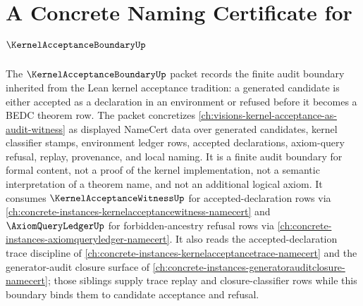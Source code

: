 \chapter{A Concrete Naming Certificate for $\KernelAcceptanceBoundaryUp$}
\label{ch:concrete-instances-kernel-acceptance-boundary-namecert}

The $\KernelAcceptanceBoundaryUp$ packet records the finite audit boundary inherited from the Lean kernel acceptance tradition: a generated candidate is either accepted as a declaration in an environment or refused before it becomes a BEDC theorem row. The packet concretizes \autoref{ch:visions-kernel-acceptance-as-audit-witness} as displayed NameCert data over generated candidates, kernel classifier stamps, environment ledger rows, accepted declarations, axiom-query refusal, replay, provenance, and local naming. It is a finite audit boundary for formal content, not a proof of the kernel implementation, not a semantic interpretation of a theorem name, and not an additional logical axiom.
It consumes $\KernelAcceptanceWitnessUp$ for accepted-declaration rows via \autoref{ch:concrete-instances-kernelacceptancewitness-namecert} and $\AxiomQueryLedgerUp$ for forbidden-ancestry refusal rows via \autoref{ch:concrete-instances-axiomqueryledger-namecert}. It also reads the accepted-declaration trace discipline of \autoref{ch:concrete-instances-kernelacceptancetrace-namecert} and the generator-audit closure surface of \autoref{ch:concrete-instances-generatorauditclosure-namecert}; those siblings supply trace replay and closure-classifier rows while this boundary binds them to candidate acceptance and refusal.

